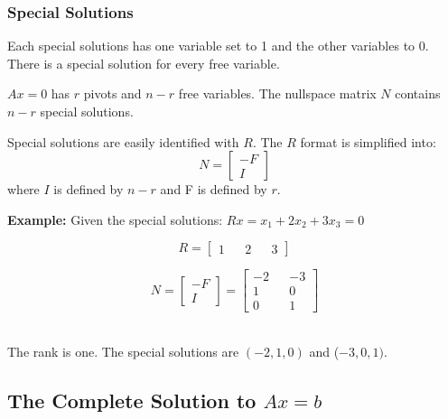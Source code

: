 \documentclass[10pt,a4paper]{article}
\begin{document}
   \subsubsection{Special Solutions}
   Each special solutions has one variable set to 1 and the other variables to 0. There is a special
   solution for every free variable.
   \begin{tcolorbox}[breakable,colback=white,colframe=black,width=\dimexpr\textwidth+12mm\relax,enlarge left by=-6mm]
   $Ax=0$ has $r$ pivots and $n-r$ free variables. The nullspace matrix $N$ contains $n-r$ special
   solutions.
   \end{tcolorbox}
   Special solutions are easily identified with $R$. The $R$ format is simplified into:
   $$N=\begin{bmatrix}
	-F\\ 
	I
	\end{bmatrix}$$ where $I$ is defined by $n-r$ and F is defined by $r$. \par 
	\textbf{Example:} Given the special solutions: $Rx=x_1+2x_2+3x_3=0$
	
	\noindent\begin{minipage}{.5\linewidth}
	\begin{equation*}
	  R = \begin{bmatrix}
		1 && 2&&3
		\end{bmatrix}
	\end{equation*}
	\end{minipage}%
	\begin{minipage}{.5\linewidth}
	\begin{equation*}
		N = \begin{bmatrix}
			-F \\
			I
			\end{bmatrix} = 
			\begin{bmatrix}
			-2 && -3 \\
			1 && 0 \\
			0 && 1
			\end{bmatrix}
	\end{equation*}
	\end{minipage} 
	\\
	The rank is one. The special solutions are $(-2, 1, 0)$ and ($-3, 0, 1)$.
	\pagebreak
	\subsection{The Complete Solution to $Ax=b$}
\end{document}
